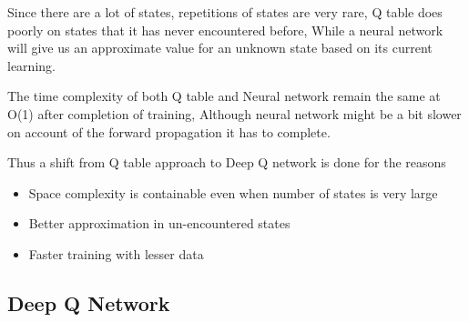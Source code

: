 \documentclass[twoside,letterpaper]{article}
\begin{document}
{Since there are a lot of states, repetitions of states are very rare, Q table does poorly on states that it has never encountered before, While a neural network will give us an approximate value for an unknown state based on its current learning. 

The time complexity of both Q table and Neural network remain the same at O(1) after completion of training, Although neural network might be a bit slower on account of the forward propagation it has to complete.


Thus a shift from Q table approach to Deep Q network is done for the reasons
\begin{itemize}
\item Space complexity is containable even when number of states is very large
\item Better approximation in un-encountered states
\item Faster training with lesser data
\end{itemize}

\subsection{Deep Q Network}
{\color{black}

}}
\end{document}
